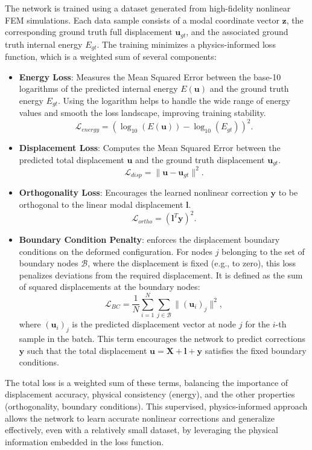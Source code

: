 \documentclass[11pt,a4paper,twocolumn]{article}
\begin{document}
The network is trained using a dataset generated from high-fidelity nonlinear FEM simulations. Each data sample consists of a modal coordinate vector $\bm{z}$, the corresponding ground truth full displacement $\bm{u}_{gt}$, and the associated ground truth internal energy $E_{gt}$. The training minimizes a physics-informed loss function, which is a weighted sum of several components:
\begin{itemize}
    \item \textbf{Energy Loss}: Measures the Mean Squared Error between the base-10 logarithms of the predicted internal energy $E(\bm{u})$ and the ground truth energy $E_{gt}$. Using the logarithm helps to handle the wide range of energy values and smooth the loss landscape, improving training stability.
    \begin{equation}
        \mathcal{L}_{energy} = (\log_{10}(E(\bm{u})) - \log_{10}(E_{gt}))^2.
    \end{equation}
    \item \textbf{Displacement Loss}: Computes the Mean Squared Error between the predicted total displacement $\bm{u}$ and the ground truth displacement $\bm{u}_{gt}$.
    \begin{equation}
        \mathcal{L}_{disp} = \|\bm{u} - \bm{u}_{gt}\|^2.
    \end{equation}
    \item \textbf{Orthogonality Loss}: Encourages the learned nonlinear correction $\bm{y}$ to be orthogonal to the linear modal displacement $\bm{l}$.
    \begin{equation}
        \mathcal{L}_{ortho} = (\bm{l}^T \bm{y})^2.
    \end{equation}
        \item \textbf{Boundary Condition Penalty}: enforces the displacement boundary conditions on the deformed configuration. For nodes \( j \) belonging to the set of boundary nodes \( \mathcal{B} \), where the displacement is fixed (e.g., to zero), this loss penalizes deviations from the required displacement. It is defined as the sum of squared displacements at the boundary nodes:
        \begin{equation}
            \mathcal{L}_{BC} = \frac{1}{N} \sum_{i=1}^N \sum_{j \in \mathcal{B}} \|(\bm{u}_i)_j\|^2,
        \end{equation}
        where \( (\bm{u}_i)_j \) is the predicted displacement vector at node \( j \) for the \( i \)-th sample in the batch. This term encourages the network to predict corrections \( \bm{y} \) such that the total displacement \( \bm{u} = \bm{X} + \bm{l} + \bm{y} \) satisfies the fixed boundary conditions.
\end{itemize}
The total loss is a weighted sum of these terms, balancing the importance of displacement accuracy, physical consistency (energy), and the other properties (orthogonality, boundary conditions). This supervised, physics-informed approach allows the network to learn accurate nonlinear corrections and generalize effectively, even with a relatively small dataset, by leveraging the physical information embedded in the loss function.
\end{document}

